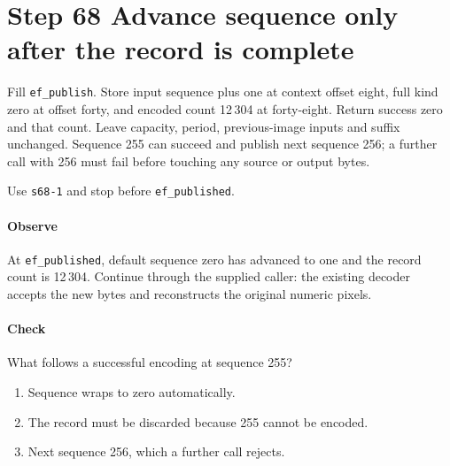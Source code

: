 \section{Step 68 Advance sequence only after the record is complete}
Fill \texttt{ef\_publish}. Store input sequence plus one at context offset eight, full kind zero at offset forty, and encoded count 12\,304 at forty-eight. Return success zero and that count. Leave capacity, period, previous-image inputs and suffix unchanged. Sequence 255 can succeed and publish next sequence 256; a further call with 256 must fail before touching any source or output bytes.

Use \texttt{s68-1} and stop before \texttt{ef\_published}.

\paragraph{Observe} At \texttt{ef\_published}, default sequence zero has advanced to one and the record count is 12\,304. Continue through the supplied caller: the existing decoder accepts the new bytes and reconstructs the original numeric pixels.

\paragraph{Check} What follows a successful encoding at sequence 255?
\begin{enumerate}[label=\Alph*.]
\item Sequence wraps to zero automatically.
\item The record must be discarded because 255 cannot be encoded.
\item Next sequence 256, which a further call rejects.
\end{enumerate}
